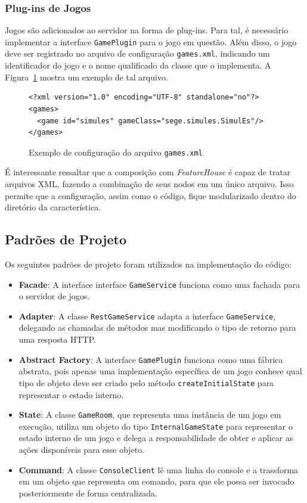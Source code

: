 \documentclass[12pt]{article}
\begin{document}
\subsubsection{Plug-ins de Jogos}

Jogos são adicionados ao servidor na forma de plug-ins. Para tal, é necessário implementar a interface \texttt{GamePlugin} para o jogo em questão. Além disso, o jogo deve ser registrado no arquivo de configuração \texttt{games.xml}, indicando um identificador do jogo e o nome qualificado da classe que o implementa. A Figura~\ref{img:gamesxml} mostra um exemplo de tal arquivo.

\begin{figure}[htb]
\centering
\footnotesize
\begin{verbatim}
<?xml version="1.0" encoding="UTF-8" standalone="no"?>
<games>
  <game id="simules" gameClass="sege.simules.SimulEs"/>
</games>
\end{verbatim}
\caption{Exemplo de configuração do arquivo \texttt{games.xml}}
\label{img:gamesxml}
\end{figure}

É interessante ressaltar que a composição com \emph{FeatureHouse} é capaz de tratar arquivos XML, fazendo a combinação de seus nodos em um único arquivo. Isso permite que a configuração, assim como o código, fique modularizado dentro do diretório da característica.

\subsection{Padrões de Projeto}

Os seguintes padrões de projeto foram utilizados na implementação do código:
\begin{itemize}
\item \textbf{Facade}: A interface interface \texttt{GameService} funciona como uma fachada para o servidor de jogos.
\item \textbf{Adapter}: A classe \texttt{RestGameService} adapta a interface \texttt{GameService}, delegando as chamadas de métodos mas modificando o tipo de retorno para uma resposta HTTP.
\item \textbf{Abstract Factory}: A interface \texttt{GamePlugin} funciona como uma fábrica abstrata, pois apenas uma implementação específica de um jogo conhece qual tipo de objeto deve ser criado pelo método \texttt{createInitialState} para representar o estado interno.
\item \textbf{State}: A classe \texttt{GameRoom}, que representa uma instância de um jogo em execução, utiliza um objeto do tipo \texttt{InternalGameState} para representar o estado interno de um jogo e delega a responsabilidade de obter e aplicar as ações disponíveis para esse objeto.
\item \textbf{Command}: A classe \texttt{ConsoleClient} lê uma linha do console e a trassforma em um objeto que representa om comando, para que ele possa ser invocado posteriormente de forma centralizada.
\end{itemize}
\end{document}
